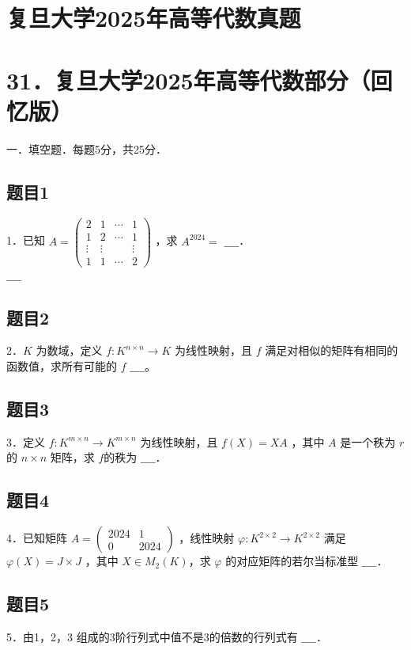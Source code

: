 \documentclass{article}
\begin{document}
\section*{复旦大学2025年高等代数真题}
\section*{31．复旦大学2025年高等代数部分（回忆版）}
一．填空题．每题5分，共25分．\\

\subsection{题目1}
1．已知 \(A=\left(\begin{array}{cccc}2 & 1 & \cdots & 1 \\ 1 & 2 & \cdots & 1 \\ \vdots & \vdots & & \vdots \\ 1 & 1 & \cdots & 2\end{array}\right)\) ，求 \(A^{2024}=\) \(\_\_\_\_\)．\\
\(\_\_\_\_\)

\subsection{题目2}
2．\(K\) 为数域，定义 \(f: K^{n \times n} \rightarrow K\) 为线性映射，且 \(f\) 满足对相似的矩阵有相同的函数值，求所有可能的 \(f\) \(\_\_\_\_\)。

\subsection{题目3}
3．定义 \(f: K^{m \times n} \rightarrow K^{m \times n}\) 为线性映射，且 \(f(X)=X A\) ，其中 \(A\) 是一个秩为 \(r\) 的 \(n \times n\) 矩阵，求 \(f\)的秩为 \(\_\_\_\_\)．

\subsection{题目4}
4．已知矩阵 \(A=\left(\begin{array}{cc}2024 & 1 \\ 0 & 2024\end{array}\right)\) ，线性映射 \(\varphi: K^{2 \times 2} \rightarrow K^{2 \times 2}\) 满足 \(\varphi(X)=J \times J\) ，其中 \(X \in M_{2}(K)\)，求 \(\varphi\) 的对应矩阵的若尔当标准型 \(\_\_\_\_\)．

\subsection{题目5}
5．由1，2，3 组成的3阶行列式中值不是3的倍数的行列式有 \(\_\_\_\_\)．
\end{document}
